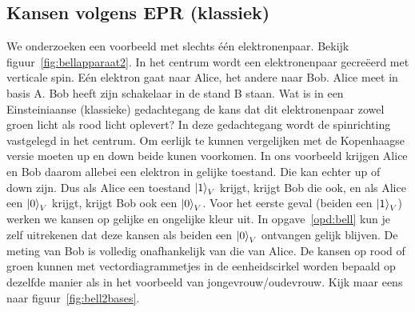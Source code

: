 \documentclass[../../main.tex]{subfiles}
\begin{document}
\subsection*{Kansen volgens EPR (klassiek)}
We onderzoeken een voorbeeld met slechts één elektronenpaar. Bekijk figuur~\ref{fig:bellapparaat2}. In het centrum wordt een elektronenpaar gecreëerd met verticale spin. Eén elektron  gaat naar Alice, het andere naar Bob. Alice meet in basis A. Bob heeft zijn schakelaar in de stand B staan. Wat is in een Einsteiniaanse (klassieke) gedachtegang de kans dat dit elektronenpaar zowel groen licht als rood licht oplevert? In deze gedachtegang wordt de spinrichting vastgelegd in het centrum. Om eerlijk te kunnen vergelijken met de Kopenhaagse versie moeten up en down beide kunen voorkomen. In ons voorbeeld krijgen Alice en Bob daarom allebei een elektron in gelijke toestand. Die kan echter up of down zijn. Dus als Alice een toestand $\ket{1}_V$ krijgt, krijgt Bob die ook, en als Alice een $\ket{0}_V$ krijgt, krijgt Bob ook een $\ket{0}_V$. Voor het eerste geval (beiden een $\ket{1}_V$) werken we kansen op gelijke en ongelijke kleur uit. In opgave~\ref{opd:bell} kun je zelf uitrekenen dat deze kansen als beiden een $\ket{0}_V$ ontvangen gelijk blijven. De meting van Bob is volledig onafhankelijk van die van Alice. De kansen op rood of groen kunnen met vectordiagrammetjes in de eenheidscirkel worden bepaald op dezelfde manier als in het voorbeeld van jongevrouw/oudevrouw. Kijk maar eens naar figuur~\ref{fig:bell2bases}.
\end{document}
